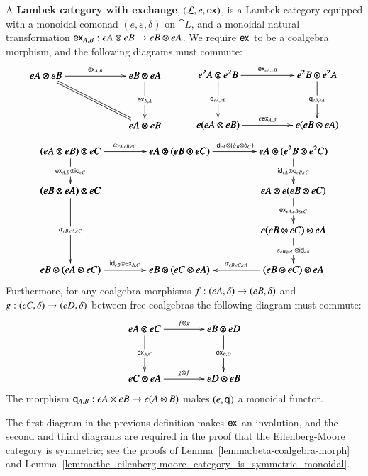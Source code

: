 \begin{definition}
  \label{def:exchange}
  A \textbf{Lambek category with exchange}, $(\mathcal{L},e,\mathsf{ex}_{})$, is a
  Lambek category equipped with a monoidal comonad
  $(e,\varepsilon,\delta)$ on $\cat{L}$, and a monoidal natural
  transformation $\mathsf{ex}_{A,B}:eA \otimes eB \rightarrow eB \otimes eA$.  We
  require $\mathsf{ex}_{}$ to be a coalgebra morphism, and the following
  diagrams must commute:
  \[
  \begin{array}{cccc}
    \bfig
    \qtriangle|amm|/->`=`->/<1000,500>[
      eA \otimes eB`
      eB \otimes eA`
      eA \otimes eB;
      \e{A,B}``
      \e{B,A}]
    \efig
    &
    \quad
    &
    \bfig
    \square|amma|<1000,500>[
      e^2A \otimes e^2B`
      e^2B \otimes e^2A`
      e(eA \otimes eB)`
      e(eB \otimes eA);
      \e{eA,eB}`
      \q{eA,eB}`
      \q{eB,eA}`
      e\e{A,B}]
    \efig          
  \end{array}
  \]
  \[
  \begin{array}{cccccccc}
    \bfig
    \square|amma|/->`->``/<1100,400>[
      (eA \otimes eB) \otimes eC`
      eA \otimes (eB \otimes eC)`
      (eB \otimes eA) \otimes eC`;
      \alpha_{eA,eB,eC}`
      \e{A,B} \otimes \id_{eC}``]
    
    \morphism(0,0)|m|/->/<0,-800>[
      (eB \otimes eA) \otimes eC`
      eB \otimes (eA \otimes eC);
      \alpha_{eB,eA,eC}]

    \morphism(0,-800)|a|/->/<1100,0>[
      eB \otimes (eA \otimes eC)`
      eB \otimes (eC \otimes eA);
      \id_{eB} \otimes \e{A,C}]
    
    \morphism(1100,400)|a|/->/<1150,0>[
      eA \otimes (eB \otimes eC)`
      eA \otimes (e^2B \otimes e^2C);
      \id_{eA} \otimes (\delta_{B} \otimes \delta_C)]
    \morphism(2250,400)|m|/->/<0,-400>[
      eA \otimes (e^2B \otimes e^2C)`
      eA \otimes e(eB \otimes eC);
      \id_{eA} \otimes \q{eB,eC}]
    \morphism(2250,0)|m|/->/<0,-400>[
      eA \otimes e(eB \otimes eC)`
      e(eB \otimes eC) \otimes eA;
      \e{eA,eB \otimes eC}]
    \morphism(2250,-400)|m|/->/<0,-400>[
      e(eB \otimes eC) \otimes eA`
      (eB \otimes eC) \otimes eA;
      \varepsilon_{eB \otimes eC} \otimes \id_{eA}]
    \morphism(2250,-800)|a|/->/<-1150,0>[
      (eB \otimes eC) \otimes eA`
      eB \otimes (eC \otimes eA);
      \alpha_{eB,eC,eA}]
    \efig
  \end{array}
  \]
  Furthermore, for any coalgebra morphisms $f : (eA, \delta) \rightarrow
  (eB,\delta)$ and $g : (eC,\delta) \rightarrow (eD,\delta)$ between free
  coalgebras the following diagram must commute:
  \[
  \bfig
  \square(0,-500)|amma|<800,500>[
    eA \otimes eC`
    eB \otimes eD`
    eC \otimes eA`
    eD \otimes eB;
    f \otimes g`
    \e{A,C}`
    \e{B,D}`
    g \otimes f]      
  \efig
  \]
  The morphism $\mathsf{q}_{A,B} : eA \otimes eB \rightarrow e(A \otimes B)$ makes
  $(e,\mathsf{q}_{})$ a monoidal functor.
\end{definition}
The first diagram in the previous definition makes $\mathsf{ex}_{}$ an
involution, and the second and third diagrams are required in the
proof that the Eilenberg-Moore category is symmetric; see the proofs of
Lemma~\ref{lemma:beta-coalgebra-morph} and
Lemma~\ref{lemma:the_eilenberg-moore_category_is_symmetric_monoidal}.


